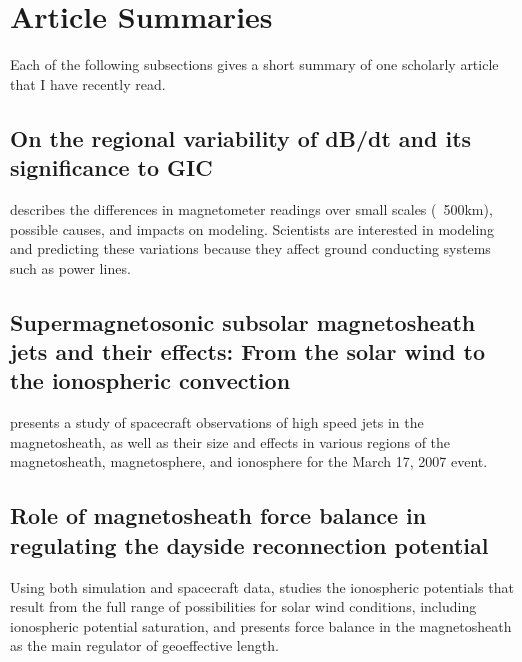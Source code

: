 \documentclass[12pt, letterpaper]{article}
\begin{document}
\section{Article Summaries}


Each of the following subsections gives a short summary of one scholarly article that I have recently read. 


\subsection{On the regional variability of dB/dt and its significance to GIC}

\citet[]{Dimmock2020} describes the differences in magnetometer readings over small scales (~500km), possible causes, and impacts on modeling. Scientists are interested in modeling and predicting these variations because they affect ground conducting systems such as power lines.


\subsection{Supermagnetosonic subsolar magnetosheath jets and their effects: From the solar wind to the ionospheric convection}

\citet[]{Hietala2012} presents a study of spacecraft observations of high speed jets in the magnetosheath, as well as their size and effects in various regions of the magnetosheath, magnetosphere, and ionosphere for the March 17, 2007 event.


\subsection{Role of magnetosheath force balance in regulating the dayside reconnection potential}

Using both simulation and spacecraft data, \citet[]{Lopez2010} studies the ionospheric potentials that result from the full range of possibilities for solar wind conditions, including ionospheric potential saturation, and presents force balance in the magnetosheath as the main regulator of geoeffective length. 


\end{document}
